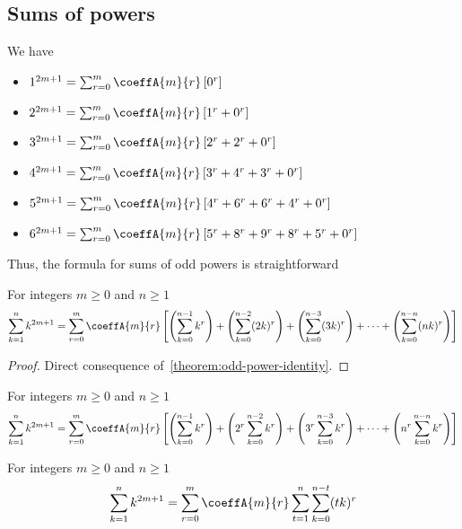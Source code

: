 \subsection{Sums of powers}
\label{subsec:sums-of-powers}
We have
\begin{itemize}
    \item $1^{2m+1} = \sum_{r=0}^{m} \coeffA{m}{r} \left[ 0^r  \right]$
    \item $2^{2m+1} = \sum_{r=0}^{m} \coeffA{m}{r} \left[ 1^r + 0^r  \right]$
    \item $3^{2m+1} = \sum_{r=0}^{m} \coeffA{m}{r} \left[ 2^r + 2^r + 0^r  \right]$
    \item $4^{2m+1} = \sum_{r=0}^{m} \coeffA{m}{r} \left[ 3^r + 4^r + 3^r + 0^r  \right]$
    \item $5^{2m+1} = \sum_{r=0}^{m} \coeffA{m}{r} \left[ 4^r + 6^r + 6^r + 4^r + 0^r  \right]$
    \item $6^{2m+1} = \sum_{r=0}^{m} \coeffA{m}{r} \left[ 5^r + 8^r + 9^r + 8^r + 5^r + 0^r  \right]$
\end{itemize}
Thus, the formula for sums of odd powers is straightforward
\begin{proposition}
    \label{prop:sums-of-odd-powers}
    For integers $m\geq 0$ and $n \geq 1$
    \begin{align*}
        \sum_{k=1}^{n} k^{2m+1}
        = \sum_{r=0}^{m} \coeffA{m}{r} \left[ \left( \sum_{k=0}^{n-1} k^r \right) +  \left( \sum_{k=0}^{n-2} (2k)^r \right) + \left( \sum_{k=0}^{n-3} (3k)^r \right)+ \cdots + \left( \sum_{k=0}^{n-n} (nk)^r \right) \right]
    \end{align*}
    \begin{proof}
        Direct consequence of~\eqref{theorem:odd-power-identity}.
    \end{proof}
\end{proposition}
\begin{corollary}
    \label{prop:sums-of-odd-powers-rearranged}
    For integers $m\geq 0$ and $n \geq 1$
    \begin{align*}
        \sum_{k=1}^{n} k^{2m+1}
        = \sum_{r=0}^{m} \coeffA{m}{r} \left[ \left( \sum_{k=0}^{n-1} k^r \right) +  \left( 2^r \sum_{k=0}^{n-2} k^r \right) + \left( 3^r \sum_{k=0}^{n-3} k^r \right)+ \cdots + \left( n^r \sum_{k=0}^{n-n} k^r \right) \right]
    \end{align*}
\end{corollary}
\begin{corollary}
    \label{cor:sums-of-odd-powers-compact-form}
    For integers $m\geq 0$ and $n \geq 1$
    \begin{align*}
        \sum_{k=1}^{n} k^{2m+1}
        = \sum_{r=0}^{m} \coeffA{m}{r} \sum_{t=1}^{n} \sum_{k=0}^{n-t} (tk)^r
    \end{align*}
\end{corollary}
